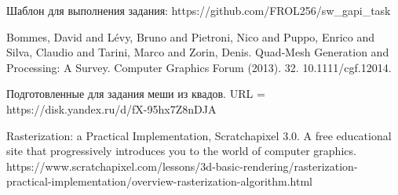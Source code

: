 \documentclass[12pt,subf,href,colorlinks=true]{article}
\begin{document}
\begin{thebibliography}{9} 
	
 Шаблон для выполнения задания: https://github.com/FROL256/sw\_gapi\_task 

 Bommes, David and Lévy, Bruno and Pietroni, Nico and Puppo, Enrico and Silva, Claudio and Tarini, Marco and Zorin, Denis. Quad‐Mesh Generation and Processing: A Survey. Computer Graphics Forum (2013). 32. 10.1111/cgf.12014. 

 Подготовленные для задания меши из квадов. \newline URL = https://disk.yandex.ru/d/fX-95hx7Z8nDJA 

 Rasterization: a Practical Implementation, Scratchapixel 3.0. A free educational site that progressively introduces you to the world of computer graphics. https://www.scratchapixel.com/lessons/3d-basic-rendering/rasterization-practical-implementation/overview-rasterization-algorithm.html

\end{thebibliography} 
\end{document}
